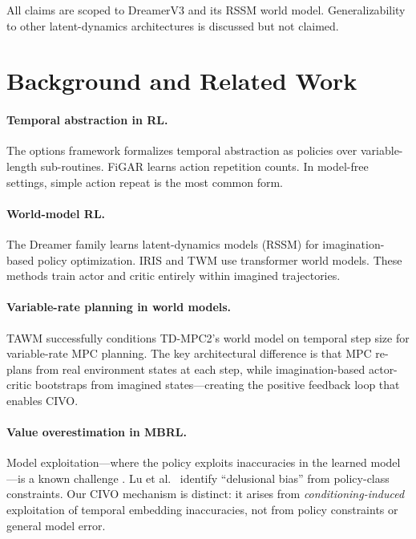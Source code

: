 \documentclass[10pt,letterpaper]{article}
\begin{document}
All claims are scoped to DreamerV3 and its RSSM world model.
Generalizability to other latent-dynamics architectures is discussed but not claimed.

\section{Background and Related Work}

\paragraph{Temporal abstraction in RL.}
The options framework \cite{sutton1999between,precup2000temporal} formalizes temporal abstraction as policies over variable-length sub-routines.
FiGAR \cite{sharma2017learning} learns action repetition counts.
In model-free settings, simple action repeat \cite{lakshminarayanan2017dynamic} is the most common form.

\paragraph{World-model RL.}
The Dreamer family \cite{hafner2020dream,hafner2021mastering,hafner2023mastering} learns latent-dynamics models (RSSM) for imagination-based policy optimization.
IRIS \cite{micheli2023transformers} and TWM \cite{robine2023transformer} use transformer world models.
These methods train actor and critic entirely within imagined trajectories.

\paragraph{Variable-rate planning in world models.}
TAWM \cite{nhu2025tawm} successfully conditions TD-MPC2's world model on temporal step size for variable-rate MPC planning.
The key architectural difference is that MPC re-plans from real environment states at each step, while imagination-based actor-critic bootstraps from imagined states---creating the positive feedback loop that enables CIVO.

\paragraph{Value overestimation in MBRL.}
Model exploitation---where the policy exploits inaccuracies in the learned model---is a known challenge \cite{janner2019trust}.
Lu et al.~\cite{lu2018non} identify ``delusional bias'' from policy-class constraints.
Our CIVO mechanism is distinct: it arises from \emph{conditioning-induced} exploitation of temporal embedding inaccuracies, not from policy constraints or general model error.
\end{document}

